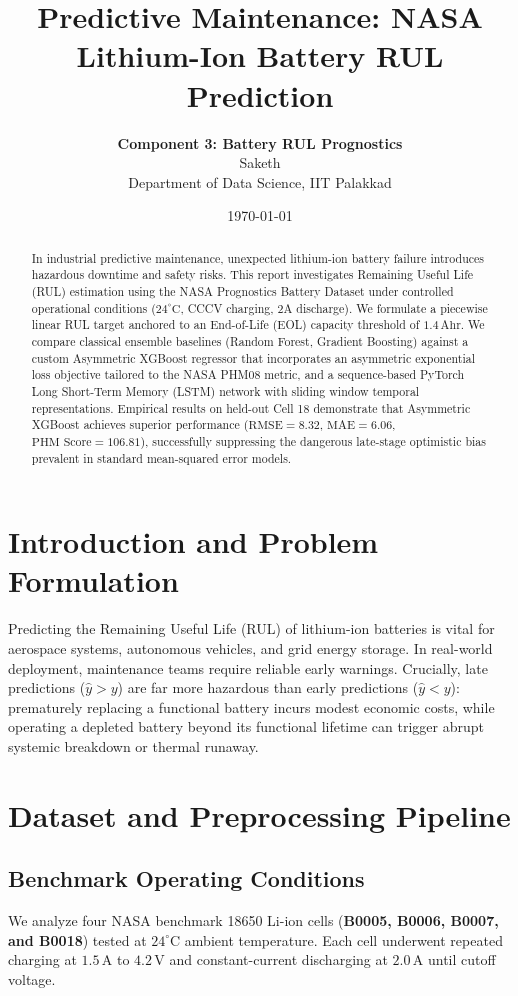 \documentclass[12pt]{article}
\title{\textbf{Predictive Maintenance: NASA Lithium-Ion Battery RUL Prediction}}
\author{\textbf{Component 3: Battery RUL Prognostics} \\ Saketh \\ Department of Data Science, IIT Palakkad}
\date{\today}
\begin{document}
\maketitle

\begin{abstract}
In industrial predictive maintenance, unexpected lithium-ion battery failure introduces hazardous downtime and safety risks. This report investigates Remaining Useful Life (RUL) estimation using the NASA Prognostics Battery Dataset under controlled operational conditions ($24^\circ\text{C}$, CCCV charging, 2A discharge). We formulate a piecewise linear RUL target anchored to an End-of-Life (EOL) capacity threshold of $1.4\,\text{Ahr}$. We compare classical ensemble baselines (Random Forest, Gradient Boosting) against a custom Asymmetric XGBoost regressor that incorporates an asymmetric exponential loss objective tailored to the NASA PHM08 metric, and a sequence-based PyTorch Long Short-Term Memory (LSTM) network with sliding window temporal representations. Empirical results on held-out Cell 18 demonstrate that Asymmetric XGBoost achieves superior performance ($\text{RMSE} = 8.32$, $\text{MAE} = 6.06$, $\text{PHM Score} = 106.81$), successfully suppressing the dangerous late-stage optimistic bias prevalent in standard mean-squared error models.
\end{abstract}

\section{Introduction and Problem Formulation}
Predicting the Remaining Useful Life (RUL) of lithium-ion batteries is vital for aerospace systems, autonomous vehicles, and grid energy storage. In real-world deployment, maintenance teams require reliable early warnings. Crucially, late predictions ($\hat{y} > y$) are far more hazardous than early predictions ($\hat{y} < y$): prematurely replacing a functional battery incurs modest economic costs, while operating a depleted battery beyond its functional lifetime can trigger abrupt systemic breakdown or thermal runaway.

\section{Dataset and Preprocessing Pipeline}

\subsection{Benchmark Operating Conditions}
We analyze four NASA benchmark 18650 Li-ion cells (\textbf{B0005, B0006, B0007, and B0018}) tested at $24^\circ\text{C}$ ambient temperature. Each cell underwent repeated charging at $1.5\,\text{A}$ to $4.2\,\text{V}$ and constant-current discharging at $2.0\,\text{A}$ until cutoff voltage.
\end{document}
